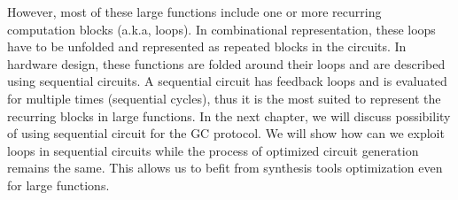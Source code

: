 However, most of these large functions include one or more recurring computation blocks (a.k.a, loops).
In combinational representation, these loops have to be unfolded and represented as repeated blocks in the circuits.
In hardware design, these functions are folded around their loops and are described using sequential circuits.
A sequential circuit has feedback loops and is evaluated for multiple times (sequential cycles), thus it is the most suited to represent the recurring blocks in large functions.
In the next chapter, we will discuss possibility of using sequential circuit for the GC protocol.
We will show how can we exploit loops in sequential circuits while the process of optimized circuit generation remains the same.
This allows us to befit from synthesis tools optimization even for large functions.
